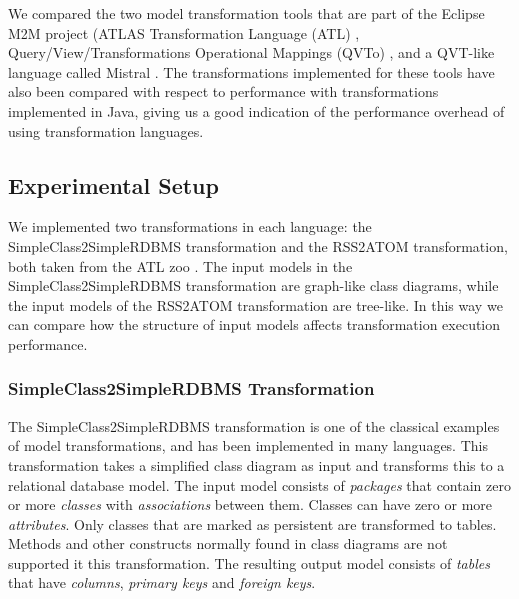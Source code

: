 \documentclass[12pt]{elsarticle}
\begin{document}
\begin{sloppypar} %
We compared the two model transformation tools that are part
of the Eclipse M2M project (ATLAS Transformation Language
(ATL) \cite{jouault08}, Query/View/Transformations Operational Mappings (QVTo)
\cite{qvt_spec}, and a QVT-like language called Mistral \cite{KurtevB04}. The
transformations implemented for these tools have also been compared with respect to performance with transformations
implemented in Java, giving us a good indication of the performance overhead of
using transformation languages.
\end{sloppypar}


\subsection{Experimental Setup}\label{sec:experimental_setup}


We implemented two transformations in each language: the SimpleClass2SimpleRDBMS transformation and the RSS2ATOM transformation, both taken from the ATL zoo \cite{atl_zoo}. The
input models in the SimpleClass2SimpleRDBMS transformation are graph-like class diagrams, while the input models
of the RSS2ATOM transformation are tree-like. In this way we can compare how the structure of input models
affects transformation execution performance.

\subsubsection*{SimpleClass2SimpleRDBMS Transformation}

The SimpleClass2SimpleRDBMS transformation is one of the classical examples of model transformations,
and has been implemented in many languages. This transformation takes a simplified
class diagram as input and transforms this to a relational database
model. The input model consists of \emph{packages} that contain zero or more
\emph{classes} with \emph{associations} between them. Classes can have zero or
more \emph{attributes}. Only classes that are marked as persistent are
transformed to tables. Methods and other constructs normally found in class
diagrams are not supported it this transformation. The resulting output model
consists of \emph{tables} that have \emph{columns}, \emph{primary keys} and \emph{foreign keys}.
\end{document}
